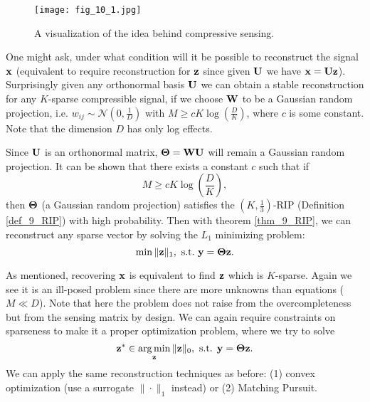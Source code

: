 \documentclass[../main.tex]{subfiles}
\begin{document}
\begin{figure}[h] 
	\centering 
	\texttt{[image: fig\_10\_1.jpg]} 
	\caption{A visualization of the idea behind compressive sensing.}\label{fig_10_1}
\end{figure}
\par One might ask, under what condition will it be possible to reconstruct the signal ${\bf x}$ (equivalent to require reconstruction for ${\bf z}$ since given ${\bf U}$ we have ${\bf x}={\bf Uz}$). Surprisingly given any orthonormal basis ${\bf U}$ we can obtain a stable reconstruction for any $K$-sparse compressible signal, if we choose ${\bf W}$ to be a Gaussian random projection, i.e. $w_{ij}\sim \mathcal{N}(0,\frac{1}{D})$ with $M\geq cK\log(\frac{D}{K})$, where $c$ is some constant. Note that the dimension $D$ has only log effects.
\begin{remark}
	Since ${\bf U}$ is an orthonormal matrix, ${\bf \Theta}={\bf WU}$ will remain a Gaussian random projection. It can be shown that there exists a constant $c$ such that if
	\begin{equation*}
	M\geq cK\log(\frac{D}{K}),
	\end{equation*}
	then ${\bf \Theta}$ (a Gaussian random projection) satisfies the $(K,\frac{1}{3})$-RIP (Definition \ref{def_9_RIP}) with high probability. Then with theorem \ref{thm_9_RIP}, we can reconstruct any sparse vector by solving the $L_1$ minimizing problem:
	\begin{equation*}
	\min \|{\bf z}\|_1,\ {\rm s.t.}\ {\bf y}={\bf \Theta z}.
	\end{equation*}
\end{remark}
As mentioned, recovering ${\bf x}$ is equivalent to find ${\bf z}$ which is $K$-sparse. Again we see it is an ill-posed problem since there are more unknowns than equations ($M\ll D$). Note that here the problem does not raise from the overcompleteness but from the sensing matrix by design. We can again require constraints on sparseness to make it a proper optimization problem, where we try to solve
\begin{equation*}
{\bf z}^*\in \mathop{\arg\min}_{\bf z}\|{\bf z}\|_0,\ \text{s.t. }{\bf y}={\bf \Theta z}.
\end{equation*} 
We can apply the same reconstruction techniques as before: (1) convex optimization (use a surrogate $\|\cdot\|_1$ instead) or (2) Matching Pursuit.
\end{document}
